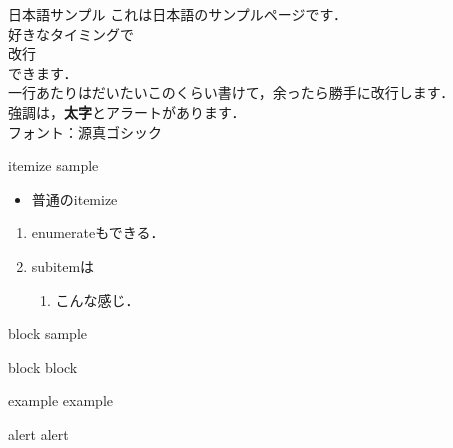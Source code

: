 \documentclass[aspectratio=1610,14pt]{beamer}
\begin{document}
\begin{frame}{日本語サンプル}
    これは日本語のサンプルページです．\\
    好きなタイミングで\\
    \alert{改行}\\
    できます．\\
    一行あたりはだいたいこのくらい書けて，余ったら勝手に改行します．\\
    強調は，\textbf{太字}と\alert{アラート}があります．\\
    フォント：源真ゴシック
\end{frame}

\begin{frame}{itemize sample}
    \begin{itemize}
        \item{普通のitemize}
            \begin{itemize}
            \end{itemize}
    \end{itemize}
    \begin{enumerate}
        \item{enumerateもできる．}
        \item{subitemは}
            \begin{enumerate}
                \item{こんな感じ．}
            \end{enumerate}
    \end{enumerate}
\end{frame}

\begin{frame}{block sample}
    \begin{block}{block}
        block
    \end{block}
    \begin{exampleblock}{example}
        example
    \end{exampleblock}
    \begin{alertblock}{alert}
        alert
    \end{alertblock}
\end{frame}
\end{document}
